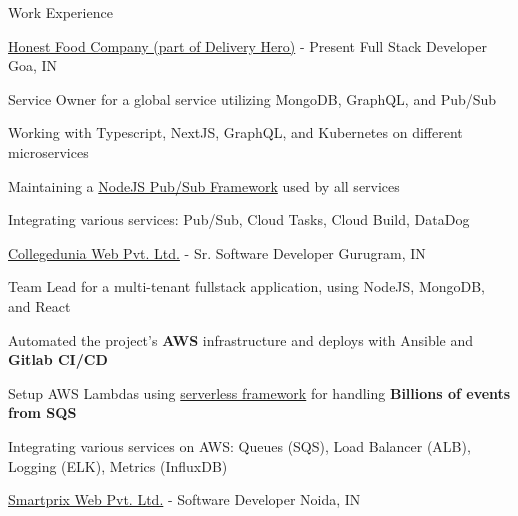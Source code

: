 \documentclass[../resume.tex]{subfiles}
\begin{document}
\begin{rSection}{Work Experience}

\begin{rSubsection}
    {\href{https://go.rohit.page/hfc}{Honest Food Company (part of Delivery Hero)}}
    {  - Present }
    {Full Stack Developer}
    {Goa, IN}

    \item Service Owner for a global service utilizing MongoDB, GraphQL, and Pub/Sub
    \item Working with Typescript, NextJS, GraphQL, and Kubernetes on different microservices
    \item Maintaining a \href{https://github.com/deliveryhero/hfc-pubsub}{NodeJS Pub/Sub Framework} used by all services
    \item Integrating various services: Pub/Sub, Cloud Tasks, Cloud Build, DataDog

\end{rSubsection}

\begin{rSubsection}
    {\href{https://go.rohit.page/cd}{Collegedunia Web Pvt. Ltd.}}
    {  -  }
    {Sr. Software Developer}
    {Gurugram, IN}

    \item Team Lead for a multi-tenant fullstack application, using NodeJS, MongoDB, and React
    \item Automated the project's \textbf{AWS} infrastructure and deploys with Ansible and \textbf{Gitlab CI/CD}
    \item Setup AWS Lambdas using \href{https://www.serverless.com/}{serverless framework} for handling \textbf{Billions of events from SQS}
    \item Integrating various services on AWS: Queues (SQS), Load Balancer (ALB), Logging (ELK), Metrics (InfluxDB)

\end{rSubsection}

\begin{rSubsection}
    {\href{https://go.rohit.page/smpx}{Smartprix Web Pvt. Ltd.}}
    {  -  }
    {Software Developer}
    {Noida, IN}


\end{rSubsection}
\end{rSection}
\end{document}
